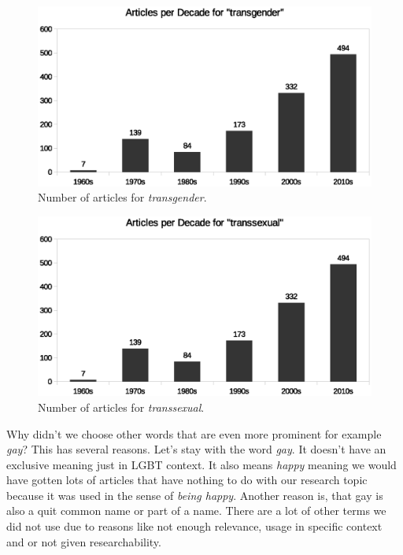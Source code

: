 \documentclass[10pt,a4paper,twocolumn]{scrartcl}
\begin{document}
\begin{figure}
\includegraphics[width=\columnwidth]{figures/transgender_decade}
\caption{Number of articles for \textit{transgender}.} \label{fig:transgender}
\end{figure}

\begin{figure}
\includegraphics[width=\columnwidth]{figures/transsexual_decade}
\caption{Number of articles for \textit{transsexual}.} \label{fig:transsexual}
\end{figure}


Why didn't we choose other words that are even more prominent for example \textit{gay}? This has several reasons. Let's stay with the word \textit{gay}. It doesn't have an exclusive meaning just in LGBT context. It also means \textit{happy} meaning we would have gotten lots of articles that have nothing to do with our research topic because it was used in the sense of \textit{being happy}. Another reason is, that gay is also a quit common name or part of a name. 
There are a lot of other terms we did not use due to reasons like not enough relevance, usage in specific context and or not given researchability. 
\end{document}
